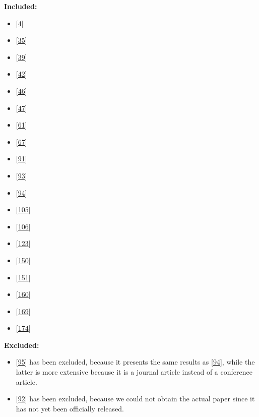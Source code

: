 \documentclass[]{book}
\providecommand{\tightlist}{%
  \setlength{\itemsep}{0pt}\setlength{\parskip}{0pt}}
\begin{document}
\textbf{Included:}

\begin{itemize}
\tightlist
\item
  {[}\protect\hyperlink{ref-adams2016a}{4}{]}
\item
  {[}\protect\hyperlink{ref-castelluccio2017a}{35}{]}
\item
  {[}\protect\hyperlink{ref-cesar2017a}{39}{]}
\item
  {[}\protect\hyperlink{ref-claes2017a}{42}{]}
\item
  {[}\protect\hyperlink{ref-da2014a}{46}{]}
\item
  {[}\protect\hyperlink{ref-da2016a}{47}{]}
\item
  {[}\protect\hyperlink{ref-dyck2015a}{61}{]}
\item
  {[}\protect\hyperlink{ref-fujibayashi2017a}{67}{]}
\item
  {[}\protect\hyperlink{ref-karvonen2017a}{91}{]}
\item
  {[}\protect\hyperlink{ref-kerzazi2013a}{93}{]}
\item
  {[}\protect\hyperlink{ref-khomh2015a}{94}{]}
\item
  {[}\protect\hyperlink{ref-laukkanen2017a}{105}{]}
\item
  {[}\protect\hyperlink{ref-laukkanen2018a}{106}{]}
\item
  {[}\protect\hyperlink{ref-mantyla2015a}{123}{]}
\item
  {[}\protect\hyperlink{ref-plewnia2014a}{150}{]}
\item
  {[}\protect\hyperlink{ref-poo-caamano2016a}{151}{]}
\item
  {[}\protect\hyperlink{ref-rodriguez2017a}{160}{]}
\item
  {[}\protect\hyperlink{ref-souza2015a}{169}{]}
\item
  {[}\protect\hyperlink{ref-teixeira2017a}{174}{]}
\end{itemize}

\textbf{Excluded:}

\begin{itemize}
\tightlist
\item
  {[}\protect\hyperlink{ref-khomh2012a}{95}{]} has been excluded,
  because it presents the same results as
  {[}\protect\hyperlink{ref-khomh2015a}{94}{]}, while the latter is more
  extensive because it is a journal article instead of a conference
  article.
\item
  {[}\protect\hyperlink{ref-kaur2019a}{92}{]} has been excluded, because
  we could not obtain the actual paper since it has not yet been
  officially released.
\end{itemize}
\end{document}
